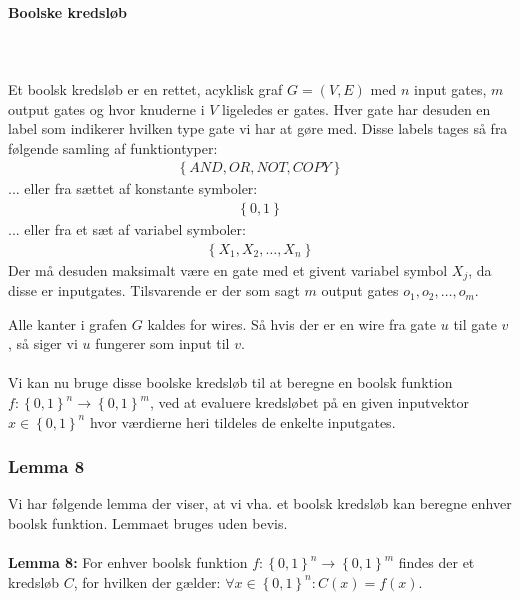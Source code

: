 \paragraph{Boolske kredsløb}
~\\
~\\
Et boolsk kredsløb er en rettet, acyklisk graf $G=(V,E)$ med $n$ input gates, $m$ output gates og hvor knuderne i $V$ ligeledes er gates. Hver gate har desuden en label som indikerer hvilken type gate vi har at gøre med. Disse labels tages så fra følgende samling af funktiontyper:
\begin{align*}
 \left\lbrace AND, OR, NOT, COPY \right\rbrace
\end{align*}
... eller fra sættet af konstante symboler: 
\begin{align*}
 \left\lbrace 0,1 \right\rbrace
\end{align*}
... eller fra et sæt af variabel symboler:
\begin{align*}
 \left\lbrace X_1, X_2, \hdots, X_n \right\rbrace
\end{align*}
Der må desuden maksimalt være en gate med et givent variabel symbol $X_j$, da disse er inputgates. Tilsvarende er der som sagt $m$ output gates $o_1,o_2,\hdots,o_m$.

Alle kanter i grafen $G$ kaldes for wires. Så hvis der er en wire fra gate $u$ til gate $v$, så siger vi $u$ fungerer som input til $v$.\\
~\\
Vi kan nu bruge disse boolske kredsløb til at beregne en boolsk funktion $f: \left\lbrace 0,1 \right\rbrace^n \rightarrow \left\lbrace 0,1 \right\rbrace^m$, ved at evaluere kredsløbet på en given inputvektor $x \in \left\lbrace 0,1 \right\rbrace^n$ hvor værdierne heri tildeles de enkelte inputgates.\\

\subsubsection{Lemma 8}

Vi har følgende lemma der viser, at vi vha. et boolsk kredsløb kan beregne enhver boolsk funktion. Lemmaet bruges uden bevis.\\
~\\
\textbf{Lemma 8:} For enhver boolsk funktion $f: \left\lbrace 0,1 \right\rbrace^n \rightarrow \left\lbrace 0,1 \right\rbrace^m$ findes der et kredsløb $C$, for hvilken der gælder: $\forall x \in \left\lbrace 0,1 \right\rbrace^n: C(x) = f(x)$. 

